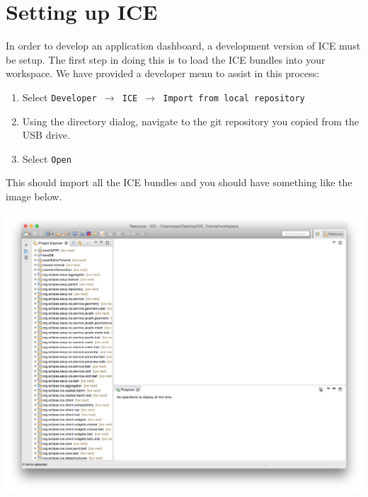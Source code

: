 \section*{Setting up ICE}
In order to develop an application dashboard, a development version of ICE
must be setup. The first step in doing this is to load the ICE bundles into
your workspace. We have provided a developer menu to assist in this process:

\begin{enumerate}
\item Select \texttt{Developer $\rightarrow$ ICE $\rightarrow$
Import from local repository}
\item Using the directory dialog, navigate to the git repository you copied
from the USB drive.
\item Select \texttt{Open}
\end{enumerate}

This should import all the ICE bundles and you should have something
like the image below.
\begin{center} \includegraphics[width=\textwidth]{figures/cloned} \end{center}

